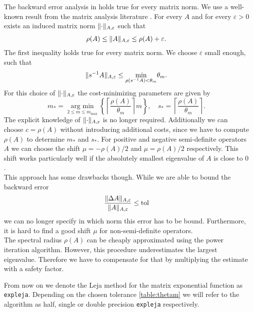 \documentclass{scrartcl}
\begin{document}
	The backward error analysis in \cite{lejarev} holds true for every matrix norm.
	We use a well-known result from the matrix analysis literature \cite[Lemma 5.6.10.]{matrixanalysis}. For every $A$ and for every $\varepsilon>0$ exists an induced matrix norm $\lVert\cdot\rVert_{A,\varepsilon}$ such that
	\[
	\rho(A) \le \lVert A\rVert_{A,\varepsilon} \le \rho(A) + \varepsilon. 
	\]
	The first inequality holds true for every matrix norm. We choose $\varepsilon$ small enough, such that
	\[
	\lVert s^{-1}A\rVert_{A,\varepsilon} \le \underset{\rho(s^{-1}A) < \theta_m}{\min}\theta_m.
	\]
	For this choice of $\lVert\cdot\rVert_{A,\varepsilon}$ the cost-minimizing parameters are given by
	\[
	m_* = \underset{2\le m\le m_{\operatorname{max}}}{\operatorname{arg\ min}}  \left\{{\left\lceil{\frac{\rho(A)}{\theta_m}}\right\rceil}m\right\}, \quad
	s_* =  \left\lceil{\frac{\rho(A)}{\theta_m}}\right\rceil.
	\]
	The explicit knowledge of $\lVert\cdot\rVert_{A,\varepsilon}$ is no longer required. Additionally we can choose $c=\rho(A)$ without introducing additional costs, since we have to compute $\rho(A)$ to determine $m_*$ and $s_*$. 
	For positive and negative semi-definite operators $A$ we can choose the shift $\mu = -\rho(A)/2$ and $\mu = \rho(A)/2$ respectively. This shift works particularly well if the absolutely smallest eigenvalue of $A$ is close to $0$.\\
	This approach has some drawbacks though. While we are able to bound the backward error
	\[
	\frac{\lVert\Delta A\rVert_{A,\varepsilon}}{\lVert A\rVert_{A,\varepsilon}} \le \operatorname{tol}  
	\]
	we can no longer specify in which norm this error has to be bound. Furthermore, it is hard to find a good shift $\mu$ for non-semi-definite operators.\\
	The spectral radius $\rho(A)$ can be cheaply approximated using the power iteration algorithm. However, this procedure underestimates the largest eigenvalue. Therefore we have to compensate for that by multiplying the estimate with a safety factor. 
	
	From now on we denote the Leja method for the matrix exponential function as \texttt{expleja}. Depending on the chosen tolerance \ref{table:thetam} we will refer to the algorithm as half, single or double precision \texttt{expleja} respectively.
	
\end{document}
